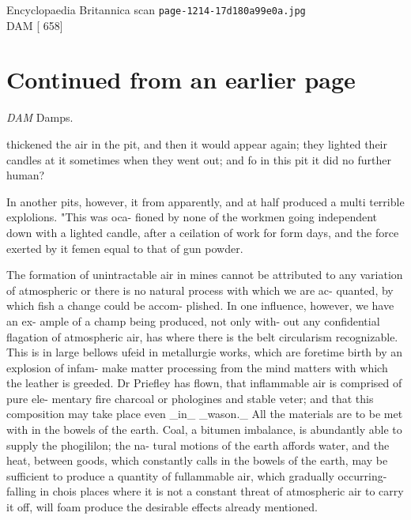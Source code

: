 \documentclass{article}
\begin{document}
\begin{center}
{\Large Encyclopaedia Britannica scan \texttt{page-1214-17d180a99e0a.jpg}}\\[0.5em]
DAM [ 658]
\end{center}
\section*{Continued from an earlier page}
\textit{DAM}
Damps.

thickened the air in the pit, and then it would appear again; they lighted their candles at it sometimes when they went out; and fo in this pit it did no further human?

In another pits, however, it from apparently, and at half produced a multi terrible explolions. "This was oca- fioned by none of the workmen going independent down with a lighted candle, after a ceilation of work for form days, and the force exerted by it femen equal to that of gun powder.

The formation of unintractable air in mines cannot be attributed to any variation of atmospheric or there is no natural process with which we are ac- quanted, by which fish a change could be accom- plished. In one influence, however, we have an ex- ample of a champ being produced, not only with- out any confidential flagation of atmospheric air, has where there is the belt circularism recognizable. This is in large bellows ufeid in metallurgie works, which are foretime birth by an explosion of infam- make matter processing from the mind matters with which the leather is greeded. Dr Priefley has flown, that inflammable air is comprised of pure ele- mentary fire charcoal or phologines and stable veter; and that this composition may take place even \_in\_ \_wason.\_ All the materials are to be met with in the bowels of the earth. Coal, a bitumen imbalance, is abundantly able to supply the phogililon; the na- tural motions of the earth affords water, and the heat, between goods, which constantly calls in the bowels of the earth, may be sufficient to produce a quantity of fullammable air, which gradually occurring- falling in chois places where it is not a constant threat of atmospheric air to carry it off, will foam produce the desirable effects already mentioned.
\end{document}
